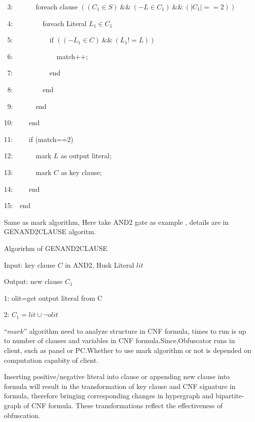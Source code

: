 \documentclass[runningheads,a4paper]{llncs}
\begin{document}
~3:~~~~~~	   foreach clause $((C_1 \in S) ~\&\&~ (-L\in C_1)~ \&\&~ (|C_1|==2)) $

~4:~~~~~~~~		foreach Literal $ L_1 \in C_1$ 

~5:~~~~~~~~~~		  if $((-L_1 \in C)~\&\&~(L_1!=L))$

~6:~~~~~~~~~~~~				match++;

~7:~~~~~~~~~~		  end

~8:~~~~~~~~		end

~9:~~~~~~          end 

10:~~~~	    end

11:~~~~     if (match==2)

12:~~~~~~	  mark $L$ as output literal;

13:~~~~~~	  mark $C$ as key clause;

14:~~~~     end

15:~~end

Same as mark algorithm, Here take AND2 gate as example , details are in GENAND2CLAUSE algoritm.

\noindent Algorirhm of GENAND2CLAUSE

Input: key clause $C$ in AND2, Husk Literal $lit$

Output: new clause $C_1$

1: olit=get output literal from C

2: $C_1= lit \cup \neg olit$

$“mark”$ algorithm need to analyze structure in CNF formula, times to run is up to number of clauses and variables in CNF formula.Since,Obfuscator runs in client, such as panel or PC.Whether to use mark algorithm or not is depended on computation capabity of client.

Inserting positive/negative literal into clause or appending new clause into formula will result in the transformation of key clause and CNF signature in formula, 
therefore bringing corresponding changes in hypergraph and bipartite-graph of CNF formula.
These transformations reflect the effectiveness of obfuscation.
\end{document}
